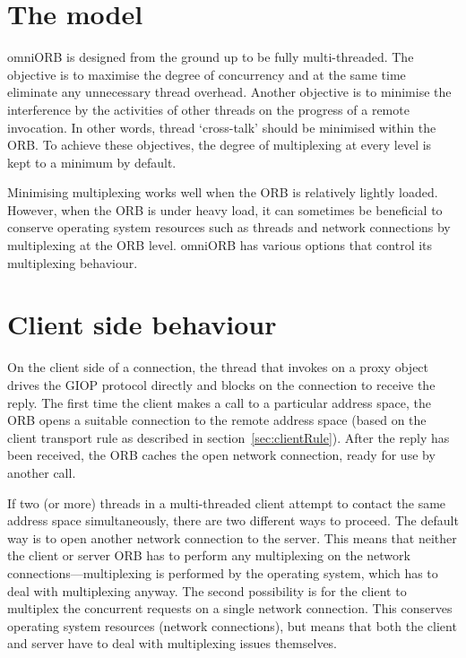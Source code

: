 \documentclass[draft,11pt,twoside,a4paper]{book}
\begin{document}
\section{The model}

omniORB is designed from the ground up to be fully multi-threaded. The
objective is to maximise the degree of concurrency and at the same
time eliminate any unnecessary thread overhead. Another objective is
to minimise the interference by the activities of other threads on the
progress of a remote invocation. In other words, thread `cross-talk'
should be minimised within the ORB. To achieve these objectives, the
degree of multiplexing at every level is kept to a minimum by default.

Minimising multiplexing works well when the ORB is relatively lightly
loaded. However, when the ORB is under heavy load, it can sometimes be
beneficial to conserve operating system resources such as threads and
network connections by multiplexing at the ORB level. omniORB has
various options that control its multiplexing behaviour.


\section{Client side behaviour}

On the client side of a connection, the thread that invokes on a proxy
object drives the GIOP protocol directly and blocks on the connection
to receive the reply. The first time the client makes a call to a
particular address space, the ORB opens a suitable connection to the
remote address space (based on the client transport rule as described
in section~\ref{sec:clientRule}). After the reply has been received,
the ORB caches the open network connection, ready for use by another
call.

If two (or more) threads in a multi-threaded client attempt to contact
the same address space simultaneously, there are two different ways to
proceed. The default way is to open another network connection to the
server. This means that neither the client or server ORB has to
perform any multiplexing on the network connections---multiplexing is
performed by the operating system, which has to deal with multiplexing
anyway. The second possibility is for the client to multiplex the
concurrent requests on a single network connection. This conserves
operating system resources (network connections), but means that both
the client and server have to deal with multiplexing issues
themselves.
\end{document}
